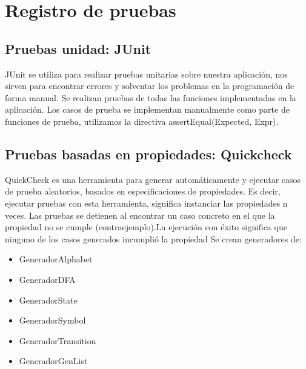 \documentclass[DIV=calc,paper=a4,fontsize=11pt,onecolumn]{scrartcl} %
\begin{document}




	\section{Registro de pruebas}
	\subsection{Pruebas unidad: JUnit}
	JUnit se utiliza para realizar pruebas unitarias sobre nuestra aplicación, nos sirven para encontrar errores y solventar los problemas en la programación de forma manual.
	Se realizan pruebas de todas las funciones implementadas en la aplicación.
	Los casos de prueba se implementan manualmente como parte de funciones de prueba, utilizamos la directiva assertEqual(Expected, Expr).
	\subsection{Pruebas basadas en propiedades: Quickcheck}
	QuickCheck es una  herramienta para generar automáticamente y ejecutar casos de prueba aleatorios, basados en especificaciones de propiedades. Es decir, ejecutar pruebas con esta herramienta, significa instanciar las propiedades n veces. Las pruebas se detienen al encontrar un caso concreto en el que la propiedad no se cumple
	(contraejemplo).La ejecución con éxito significa que ninguno de los casos generados incumplió la propiedad
	Se crean generadores de:
	\begin{itemize}
		\item GeneradorAlphabet
		\item GeneradorDFA
		\item GeneradorState
		\item GeneradorSymbol
		\item GeneradorTransition
		\item GeneradorGenList
	\end{itemize}
	
\end{document}

